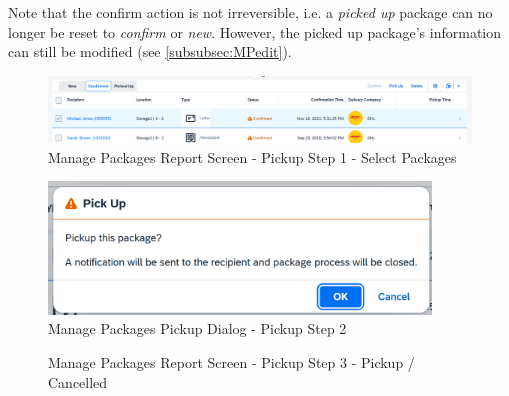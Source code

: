 \bigskip
Note that the confirm action is not irreversible, i.e. a \textit{picked up} package can no longer be reset to \textit{confirm} or \textit{new}. However, the picked up package's information can still be modified (see \autoref{subsubsec:MPedit}).

\begin{figure}[H]
	\centering
	\includegraphics[width=1\linewidth]{images/user_doc/managePack/ReportScreen/pickup/pickupEnabled.png}
	\caption{Manage Packages Report Screen - Pickup Step 1 - Select Packages}
	\label{fig:MPReportPickupBtn}
\end{figure}

\begin{figure}[H]
	\centering
	\includegraphics[height=100pt]{images/user_doc/managePack/ReportScreen/pickup/pickupDialogOk.png}
	\caption{Manage Packages Pickup Dialog - Pickup Step 2}
	\label{fig:MPReportPickupDlg}
\end{figure}

\begin{figure}[H]
	\centering
	\hspace{5pt}
    \caption{Manage Packages Report Screen - Pickup Step 3 - Pickup / Cancelled}
	\label{fig:MPReportPickupDlgButton}
\end{figure}

